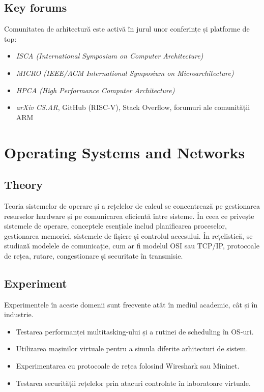 \documentclass[12pt, letterpaper]{article}
\begin{document}
\subsection*{Key forums}
Comunitatea de arhitectură este activă în jurul unor conferințe și platforme de top:
\begin{itemize}
    \item \textit{ISCA (International Symposium on Computer Architecture)}
    \item \textit{MICRO (IEEE/ACM International Symposium on Microarchitecture)}
    \item \textit{HPCA (High Performance Computer Architecture)}
    \item \textit{arXiv CS.AR}, GitHub (RISC-V), Stack Overflow, forumuri ale comunității ARM
\end{itemize}


\newpage

\section{Operating Systems and Networks}

\subsection*{Theory}
Teoria sistemelor de operare și a rețelelor de calcul se concentrează pe gestionarea resurselor hardware și pe comunicarea eficientă între sisteme. În ceea ce privește sistemele de operare, conceptele esențiale includ planificarea proceselor, gestionarea memoriei, sistemele de fișiere și controlul accesului. În rețelistică, se studiază modelele de comunicație, cum ar fi modelul OSI sau TCP/IP, protocoale de rețea, rutare, congestionare și securitate în transmisie.

\subsection*{Experiment}
Experimentele în aceste domenii sunt frecvente atât în mediul academic, cât și în industrie.
\begin{itemize}
    \item Testarea performanței multitasking-ului și a rutinei de scheduling în OS-uri.
    \item Utilizarea mașinilor virtuale pentru a simula diferite arhitecturi de sistem.
    \item Experimentarea cu protocoale de rețea folosind Wireshark sau Mininet.
    \item Testarea securității rețelelor prin atacuri controlate în laboratoare virtuale.
\end{itemize}
\end{document}
